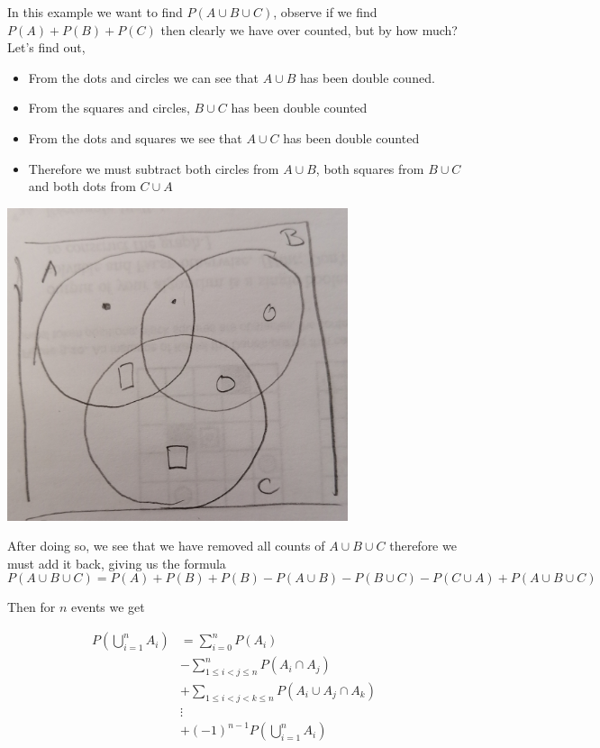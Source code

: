 \documentclass[11pt]{book}
\begin{document}
In this example we want to find $P\left(A\cup B\cup C\right) $,  observe  if we find $P\left(A\right)  + P\left(B\right)  + P\left(C\right) $ then clearly we have over counted, but by how much? Let's find out,
\begin{itemize}
    \item From the dots and circles we can see that $A\cup B$ has been double couned.
    \item From the squares and circles, $B\cup C$ has been double counted
    \item From the dots and squares we see that $A\cup C$ has been double counted
    \item Therefore we must subtract both circles from $A\cup B$, both squares from $B\cup C$ and both dots from $C\cup A$ 
\end{itemize}

\begin{center}
    \includegraphics[width=100mm]{assets/lec1_triple_2.jpg} 
\end{center}

After doing so, we see that we have removed all counts of $A\cup B\cup C$ therefore we must add it back, giving us the formula 
\[
P\left(A\cup B\cup C\right) = P\left(A\right)  + P\left(B\right)  + P\left(B\right) - P\left(A\cup B\right)  - P\left(B\cup C\right)  - P\left(C\cup A\right)  + P\left(A\cup B\cup C\right) 
\]

\newpage

Then for $n$ events we get 
\begin{defn}\label{defn:inclusion_exclusion_principle}
    \begin{align*}
        P\left(\bigcup_{i=1}^{n} A_{i} \right) &= \sum_{i=0}^{n} P\left(A_{i} \right)  \\
        &- \sum_{1\le i<j \le n}^{n} P\left(A_{i} \cap A_{j} \right)     \\ 
        &+    \sum_{1\le i < j< k \le n} P\left(A_{i} \cup A_{j} \cap A_{k} \right)  \\ 
        &\vdots    \\ 
        &+ \left( -1 \right) ^{n - 1} P\left(\bigcup_{i=1}^{n} A_{i} \right)   
    \end{align*}
\end{defn}
\end{document}
